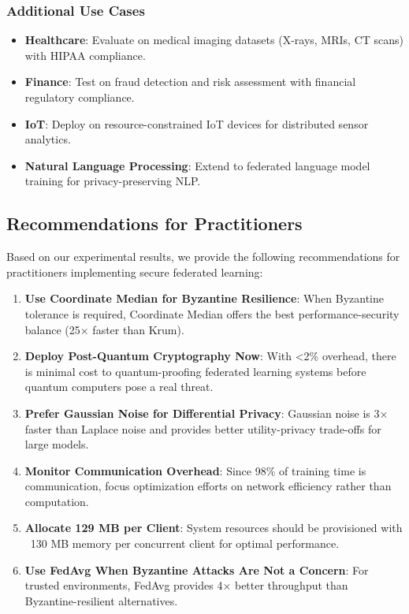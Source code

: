 \documentclass[12pt,a4paper]{article}
\begin{document}
\subsubsection{Additional Use Cases}

\begin{itemize}
    \item \textbf{Healthcare}: Evaluate on medical imaging datasets (X-rays, MRIs, CT scans) with HIPAA compliance.
    \item \textbf{Finance}: Test on fraud detection and risk assessment with financial regulatory compliance.
    \item \textbf{IoT}: Deploy on resource-constrained IoT devices for distributed sensor analytics.
    \item \textbf{Natural Language Processing}: Extend to federated language model training for privacy-preserving NLP.
\end{itemize}

\subsection{Recommendations for Practitioners}

Based on our experimental results, we provide the following recommendations for practitioners implementing secure federated learning:

\begin{enumerate}
    \item \textbf{Use Coordinate Median for Byzantine Resilience}: When Byzantine tolerance is required, Coordinate Median offers the best performance-security balance (25× faster than Krum).
    
    \item \textbf{Deploy Post-Quantum Cryptography Now}: With <2\% overhead, there is minimal cost to quantum-proofing federated learning systems before quantum computers pose a real threat.
    
    \item \textbf{Prefer Gaussian Noise for Differential Privacy}: Gaussian noise is 3× faster than Laplace noise and provides better utility-privacy trade-offs for large models.
    
    \item \textbf{Monitor Communication Overhead}: Since 98\% of training time is communication, focus optimization efforts on network efficiency rather than computation.
    
    \item \textbf{Allocate 129 MB per Client}: System resources should be provisioned with ~130 MB memory per concurrent client for optimal performance.
    
    \item \textbf{Use FedAvg When Byzantine Attacks Are Not a Concern}: For trusted environments, FedAvg provides 4× better throughput than Byzantine-resilient alternatives.
\end{enumerate}
\end{document}
